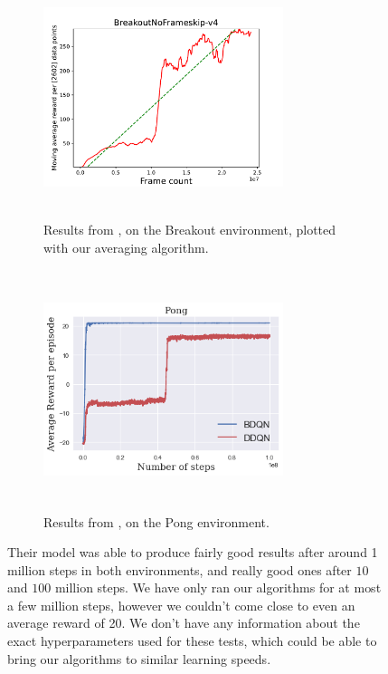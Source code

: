 \documentclass{article}
\begin{document}
\begin{figure}[H]
\centering
\begin{subfigure}{.5\textwidth}
  \centering
  \includegraphics[width=7cm,height=7cm,keepaspectratio]{img/BreakoutNoFrameskipv4.pdf}
  \caption{Results from \cite{BDQN}, on the Breakout environment, plotted with our averaging algorithm.}
  \label{fig:sub1}
\end{subfigure}%
\begin{subfigure}{.5\textwidth}
  \centering
  \includegraphics[width=7cm,height=7cm,keepaspectratio]{img/Pong.png}
  \caption{Results from \cite{BDQN}, on the Pong environment.}
  \label{fig:sub2}
\end{subfigure}
\caption{Their model was able to produce fairly good results after around 1 million steps in both environments, and really good ones after $10$ and $100$ million steps. We have only ran our algorithms for at most a few million steps, however we couldn't come close to even an average reward of 20. We don't have any information about the exact hyperparameters used for these tests, which could be able to bring our algorithms to similar learning speeds.}
\end{figure}
\end{document}
